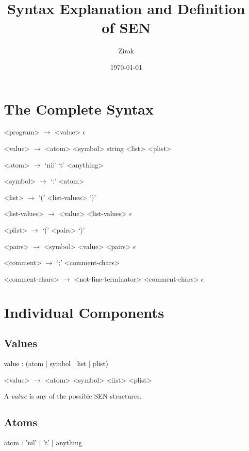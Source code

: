 \documentclass[a4paper]{article}
\begin{document}
\title{Syntax Explanation and Definition of SEN}
\author{Zirak}
\date{\today}

\maketitle

\tableofcontents

\section{The Complete Syntax}

\begin{grammar}
	<program> $\to$ <value>
		\alt $\epsilon$
		
	<value> $\to$ <atom>
		\alt <symbol>
		\alt string
		\alt <plist>
		
	<atom> $\to$ `nil'
		\alt `t'
		\alt <anything>
		
	<symbol> $\to$ `:' <atom>
	
	<list> $\to$ `(' <list-values> `)'

	<list-values> $\to$ <value> <list-values>
		\alt $\epsilon$
		
	<plist> $\to$ `(' <pairs> `)'

	<pairs> $\to$ <symbol> <value> <pairs>
		\alt $\epsilon$
		
	<comment> $\to$ `;' <comment-chars>
	
	<comment-chars> $\to$ <not-line-terminator> <comment-chars>
		\alt $\epsilon$
\end{grammar}

\section{Individual Components}

\subsection{Values}
\begin{rail}
	value : (atom | symbol | list | plist)
\end{rail}

\begin{grammar}
	<value> $\to$ <atom>
		\alt <symbol>
		\alt <plist>
\end{grammar}

A $value$ is any of the possible SEN structures.

\subsection{Atoms}
\begin{rail}
	atom : 'nil' | 't' | anything
\end{rail}
\end{document}
